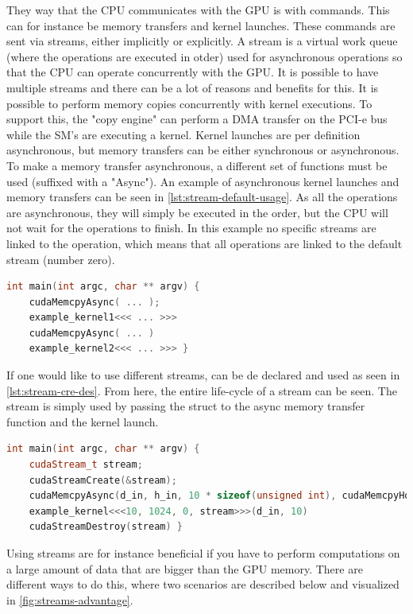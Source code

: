 They way that the CPU communicates with the GPU is with commands.
This can for instance be memory transfers and kernel launches.
These commands are sent via streams, either implicitly or explicitly.
A stream is a virtual work queue (where the operations are executed in otder) used for asynchronous operations so that the CPU can operate concurrently with the GPU.
It is possible to have multiple streams and there can be a lot of reasons and benefits for this.
It is possible to perform memory copies concurrently with kernel executions.
To support this, the "copy engine" can perform a DMA transfer on the PCI-e bus while the SM's are executing a kernel.
Kernel launches are per definition asynchronous, but memory transfers can be either synchronous or asynchronous.
To make a memory transfer asynchronous, a different set of \cuda{} functions must be used (suffixed with a "Async").
An example of asynchronous kernel launches and memory transfers can be seen in \autoref{lst:stream-default-usage}.
As all the operations are asynchronous, they will simply be executed in the order, but the CPU will not wait for the operations to finish.
In this example no specific streams are linked to the operation, which means that all operations are linked to the default stream (number zero).
\begin{lstlisting}[language=C++,caption={Default stream usage},label=lst:stream-default-usage]
int main(int argc, char ** argv) {
	cudaMemcpyAsync( ... );
	example_kernel1<<< ... >>>
	cudaMemcpyAsync( ... )
	example_kernel2<<< ... >>> }
\end{lstlisting}
If one would like to use different streams, can be de declared and used as seen in \autoref{lst:stream-cre-des}.
From here, the entire life-cycle of a \cuda{} stream can be seen.
The stream is simply used by passing the \cuda{} struct to the async memory transfer function and the kernel launch.
\begin{lstlisting}[language=C++,caption={Stream creation, usage and destruction},label=lst:stream-cre-des]
int main(int argc, char ** argv) {
	cudaStream_t stream;
	cudaStreamCreate(&stream);
	cudaMemcpyAsync(d_in, h_in, 10 * sizeof(unsigned int), cudaMemcpyHostToDevice, stream);
	example_kernel<<<10, 1024, 0, stream>>>(d_in, 10)
	cudaStreamDestroy(stream) }
\end{lstlisting}
Using streams are for instance beneficial if you have to perform computations on a large amount of data that are bigger than the GPU memory.
There are different ways to do this, where two scenarios are described below and visualized in \autoref{fig:streams-advantage}.
